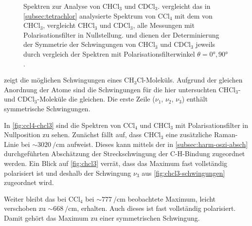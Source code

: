 \documentclass[../bericht.tex]{subfiles}
\begin{document}
\begin{figure}[p]
{
            \label{fig:cdcl3}}
          \caption[Spektren zur Analyse von $\mathrm{CHCl_3}$ und $\mathrm{CDCl_3}$.]{Spektren zur Analyse von $\mathrm{CHCl_3}$ und $\mathrm{CDCl_3}$. \protect{} vergleicht das in \cref{subsec:tetrachlor} analysierte Spektrum von $\mathrm{CCl_4}$ mit dem von $\mathrm{CHCl_3}$, \protect{} vergleicht $\mathrm{CHCl_3}$ und $\mathrm{CDCl_3}$, alle Messungen mit Polarisationsfilter in Nullstellung. \protect{} und \protect{} dienen der Determinierung der Symmetrie der Schwingungen von $\mathrm{CHCl_3}$ und $\mathrm{CDCl_3}$ jeweils durch vergleich der Spektren mit Polarisationsfilterwinkel $\theta=\ang{0},\ang{90}$.}
          \label{fig:chcl3-cdcl3-analysis}
        \end{figure}

         zeigt die möglichen Schwingungen eines $\mathrm{CH_3Cl}$-Moleküls. Aufgrund der gleichen Anordnung der Atome sind die Schwingungen für die hier untersuchten $\mathrm{CHCl_3}$- und $\mathrm{CDCl_3}$-Moleküle die gleichen. Die erste Zeile ($\nu_1$, $\nu_2$, $\nu_3$) enthält symmetrische Schwingungen.
        \medskip

        In \cref{fig:ccl4-chcl3} sind die Spektren von $\mathrm{CCl_4}$ und $\mathrm{CHCl_3}$ mit Polarisationsfilter in Nullposition zu sehen. Zunächst fällt auf, dass $\mathrm{CHCl_3}$ eine zusätzliche Raman-Linie bei $\sim \SI{3020}{\per\centi\meter}$ aufweist. Dieses kann mittels der in \cref{subsec:harm-oszi-absch} durchgeführten Abschätzung der Streckschwingung der C-H-Bindung zugeordnet werden. Ein Blick auf \cref{fig:chcl3} verrät, dass das Maximum fast vollständig polarisiert ist und deshalb der Schwingung $\nu_3$ aus \cref{fig:chcl3-schwingungen} zugeordnet wird.

        Weiter bleibt das bei $\mathrm{CCl_4}$ bei $\sim\SI{777}{\per\centi\meter}$ beobachtete Maximum, leicht verschoben zu $\sim \SI{668}{\per\centi\meter}$, erhalten. Auch dieses ist fast vollständig polarisiert. Damit gehört das Maximum zu einer symmetrischen Schwingung.
\end{document}
